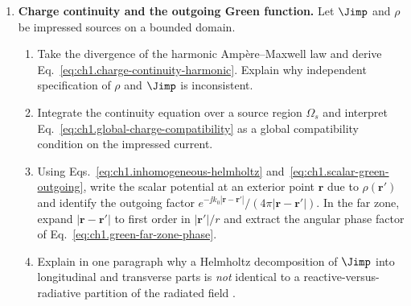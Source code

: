 \begin{enumerate}
\item \textbf{Charge continuity and the outgoing Green function.}
Let $\Jimp$ and $\rho$ be impressed sources on a bounded domain.
\begin{enumerate}[label=(\alph*)]
\item Take the divergence of the harmonic Amp\`ere--Maxwell law and derive Eq.~\eqref{eq:ch1.charge-continuity-harmonic}. Explain why independent specification of $\rho$ and $\Jimp$ is inconsistent.
\item Integrate the continuity equation over a source region $\Omega_s$ and interpret Eq.~\eqref{eq:ch1.global-charge-compatibility} as a global compatibility condition on the impressed current.
\item Using Eqs.~\eqref{eq:ch1.inhomogeneous-helmholtz} and~\eqref{eq:ch1.scalar-green-outgoing}, write the scalar potential at an exterior point $\mathbf{r}$ due to $\rho(\mathbf{r}')$ and identify the outgoing factor $e^{-\jj k_0|\mathbf{r}-\mathbf{r}'|}/(4\pi|\mathbf{r}-\mathbf{r}'|)$. In the far zone, expand $|\mathbf{r}-\mathbf{r}'|$ to first order in $|\mathbf{r}'|/r$ and extract the angular phase factor of Eq.~\eqref{eq:ch1.green-far-zone-phase}.
\item Explain in one paragraph why a Helmholtz decomposition of $\Jimp$ into longitudinal and transverse parts is \emph{not} identical to a reactive-versus-radiative partition of the radiated field \cite{stratton1941,jackson1999}.
\end{enumerate}


\end{enumerate}
